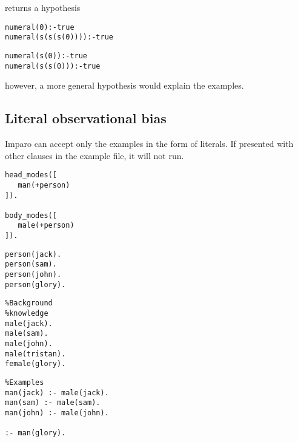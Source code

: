 returns a hypothesis

\begin{minipage}[t]{.50\textwidth}
\begin{lstlisting}
numeral(0):-true
numeral(s(s(s(0)))):-true
\end{lstlisting}
\end{minipage}
\begin{minipage}[t]{.20\textwidth}
\begin{lstlisting}
numeral(s(0)):-true
numeral(s(s(0))):-true
\end{lstlisting}
\end{minipage}


however, a more general hypothesis  would explain the examples.

\subsection{Literal observational bias}
Imparo can accept only the examples in the form of literals. If presented with other clauses in the example file, it will not run.

\begin{minipage}[t]{.25\textwidth}
\begin{lstlisting}
head_modes([
   man(+person)
]).

body_modes([
   male(+person)
]).\end{lstlisting}
\end{minipage}
\begin{minipage}[t]{.20\textwidth}
\begin{lstlisting}
person(jack).
person(sam).
person(john).
person(glory).
\end{lstlisting}
\end{minipage}
\begin{minipage}[t]{.20\textwidth}
\begin{lstlisting}
%Background
%knowledge
male(jack).
male(sam).
male(john).
male(tristan).
female(glory).
\end{lstlisting}
\end{minipage}
\begin{minipage}[t]{.25\textwidth}
\begin{lstlisting}
%Examples
man(jack) :- male(jack).
man(sam) :- male(sam).
man(john) :- male(john).

:- man(glory).
\end{lstlisting}
\end{minipage}

